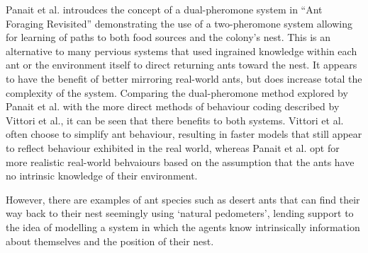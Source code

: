     
    Panait et al. introudces the concept of a dual-pheromone system in ``Ant Foraging Revisited''\cite{a_panait_ant_2004} demonstrating the use of a two-pheromone system allowing for learning of paths to both food sources
    and the colony's nest. This is an alternative to many pervious systems that used ingrained knowledge within each ant or the environment itself to direct returning ants toward the nest. It appears to have the benefit %
    of better mirroring real-world ants, but does increase total the complexity of the system.
    Comparing the dual-pheromone method explored by Panait et al.\cite{a_panait_ant_2004} with the more direct methods of behaviour coding described by Vittori et al.\cite{vittori_modeling_2004}, it can be seen that there
    benefits to both systems. Vittori et al. often choose to simplify ant behaviour, resulting in faster models that still appear to reflect behaviour exhibited in the real world, %
    whereas Panait et al. opt for more realistic real-world behvaiours based on the assumption that the ants have no intrinsic knowledge of their environment.
    
    However, there are examples of ant species such as desert ants that can find their way back to their nest seemingly using `natural pedometers'\cite{9}, lending support to the idea of modelling a system in which 
    the agents know intrinsically information about themselves and the position of their nest.


